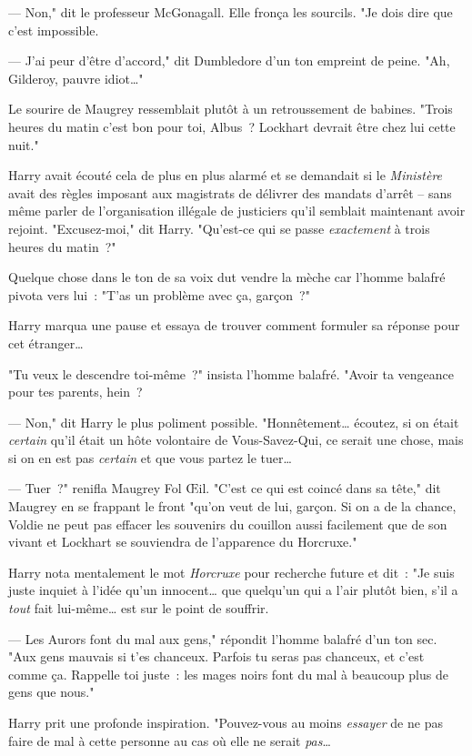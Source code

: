 --- Non," dit le professeur McGonagall. Elle fronça les sourcils. "Je dois dire que c'est impossible.

--- J'ai peur d'être d'accord," dit Dumbledore d'un ton empreint de peine. "Ah, Gilderoy, pauvre idiot…"

Le sourire de Maugrey ressemblait plutôt à un retroussement de babines. "Trois heures du matin c'est bon pour toi, Albus~? Lockhart devrait être chez lui cette nuit."

Harry avait écouté cela de plus en plus alarmé et se demandait si le \emph{Ministère} avait des règles imposant aux magistrats de délivrer des mandats d'arrêt -- sans même parler de l'organisation illégale de justiciers qu'il semblait maintenant avoir rejoint. "Excusez-moi," dit Harry. "Qu'est-ce qui se passe \emph{exactement} à trois heures du matin~?"

Quelque chose dans le ton de sa voix dut vendre la mèche car l'homme balafré pivota vers lui~: "T'as un problème avec ça, garçon~?"

Harry marqua une pause et essaya de trouver comment formuler sa réponse pour cet étranger…

"Tu veux le descendre toi-même~?" insista l'homme balafré. "Avoir ta vengeance pour tes parents, hein~?

--- Non," dit Harry le plus poliment possible. "Honnêtement… écoutez, si on était \emph{certain} qu'il était un hôte volontaire de Vous-Savez-Qui, ce serait une chose, mais si on en est pas \emph{certain} et que vous partez le tuer…

--- Tuer~?" renifla Maugrey Fol Œil. "C'est ce qui est coincé dans sa tête," dit Maugrey en se frappant le front "qu'on veut de lui, garçon. Si on a de la chance, Voldie ne peut pas effacer les souvenirs du couillon aussi facilement que de son vivant et Lockhart se souviendra de l'apparence du Horcruxe."

Harry nota mentalement le mot \emph{Horcruxe} pour recherche future et dit~: "Je suis juste inquiet à l'idée qu'un innocent… que quelqu'un qui a l'air plutôt bien, s'il a \emph{tout} fait lui-même… est sur le point de souffrir.

--- Les Aurors font du mal aux gens," répondit l'homme balafré d'un ton sec. "Aux gens mauvais si t'es chanceux. Parfois tu seras pas chanceux, et c'est comme ça. Rappelle toi juste~: les mages noirs font du mal à beaucoup plus de gens que nous."

Harry prit une profonde inspiration. "Pouvez-vous au moins \emph{essayer} de ne pas faire de mal à cette personne au cas où elle ne serait \emph{pas}…

